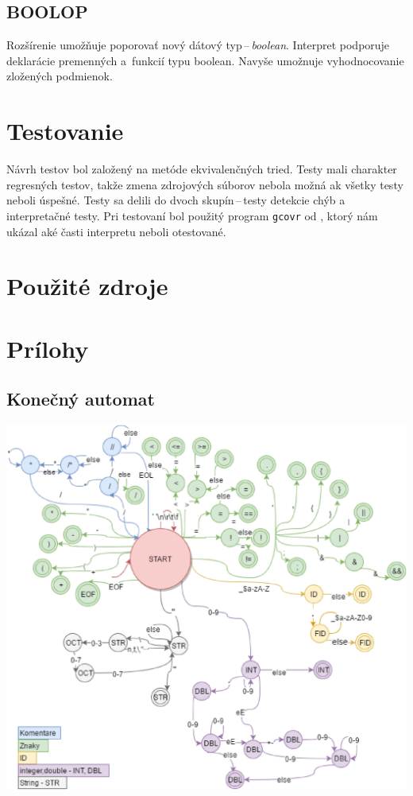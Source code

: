 \documentclass[11pt,a4paper]{article}
\begin{document}
	\subsection{BOOLOP}
	Rozšírenie umožňuje poporovať nový dátový typ\,--\,\emph{boolean}. Interpret
	podporuje deklarácie premenných a~funkcií typu boolean. Navyše
	umožnuje vyhodnocovanie zložených podmienok.

	\section{Testovanie}
	\label{testovanie}
	Návrh testov bol založený na metóde ekvivalenčných tried. Testy mali charakter
	regresných testov, takže zmena zdrojových súborov nebola možná ak
	všetky testy neboli úspešné. Testy sa delili do dvoch skupín\,--\,testy
	detekcie chýb a interpretačné testy. Pri testovaní bol použitý program
	\texttt{gcovr} od \cite{COV}, ktorý nám ukázal aké časti interpretu neboli otestované.
	\newpage
	\section{Použité zdroje}
	{}
	

	\newpage
	\section{Prílohy}


	\subsection{Konečný automat}
	\label{app:automat}
	\hspace{2cm}
	\begin{center}
		\scalebox{0.7} {\includegraphics{IFJ.eps}}
	\end{center}
\end{document}
